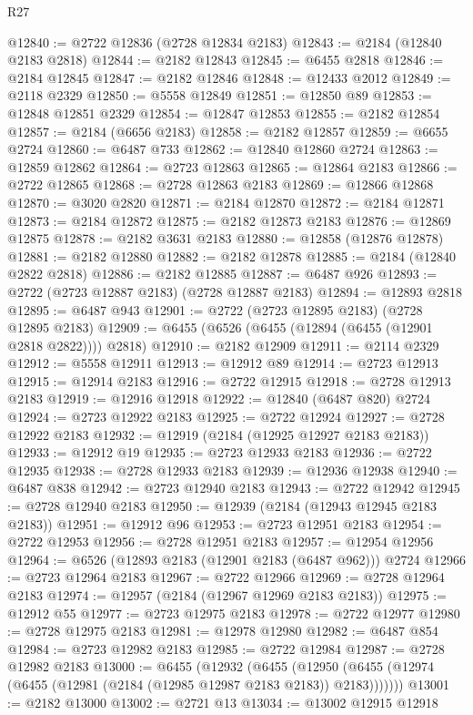 \begin{lexlean}{R27}
\begin{coremodule}
@12840 := @2722 @12836 (@2728 @12834 @2183)
@12843 := @2184 (@12840 @2183 @2818)
@12844 := @2182 @12843
@12845 := @6455 @2818
@12846 := @2184 @12845
@12847 := @2182 @12846
@12848 := @12433 @2012
@12849 := @2118 @2329
@12850 := @5558 @12849
@12851 := @12850 @89
@12853 := @12848 @12851 @2329
@12854 := @12847 @12853
@12855 := @2182 @12854
@12857 := @2184 (@6656 @2183)
@12858 := @2182 @12857
@12859 := @6655 @2724
@12860 := @6487 @733
@12862 := @12840 @12860 @2724
@12863 := @12859 @12862
@12864 := @2723 @12863
@12865 := @12864 @2183
@12866 := @2722 @12865
@12868 := @2728 @12863 @2183
@12869 := @12866 @12868
@12870 := @3020 @2820
@12871 := @2184 @12870
@12872 := @2184 @12871
@12873 := @2184 @12872
@12875 := @2182 @12873 @2183
@12876 := @12869 @12875
@12878 := @2182 @3631 @2183
@12880 := @12858 (@12876 @12878)
@12881 := @2182 @12880
@12882 := @2182 @12878
@12885 := @2184 (@12840 @2822 @2818)
@12886 := @2182 @12885
@12887 := @6487 @926
@12893 := @2722 (@2723 @12887 @2183) (@2728 @12887 @2183)
@12894 := @12893 @2818
@12895 := @6487 @943
@12901 := @2722 (@2723 @12895 @2183) (@2728 @12895 @2183)
@12909 := @6455 (@6526 (@6455 (@12894 (@6455 (@12901 @2818 @2822)))) @2818)
@12910 := @2182 @12909
@12911 := @2114 @2329
@12912 := @5558 @12911
@12913 := @12912 @89
@12914 := @2723 @12913
@12915 := @12914 @2183
@12916 := @2722 @12915
@12918 := @2728 @12913 @2183
@12919 := @12916 @12918
@12922 := @12840 (@6487 @820) @2724
@12924 := @2723 @12922 @2183
@12925 := @2722 @12924
@12927 := @2728 @12922 @2183
@12932 := @12919 (@2184 (@12925 @12927 @2183 @2183))
@12933 := @12912 @19
@12935 := @2723 @12933 @2183
@12936 := @2722 @12935
@12938 := @2728 @12933 @2183
@12939 := @12936 @12938
@12940 := @6487 @838
@12942 := @2723 @12940 @2183
@12943 := @2722 @12942
@12945 := @2728 @12940 @2183
@12950 := @12939 (@2184 (@12943 @12945 @2183 @2183))
@12951 := @12912 @96
@12953 := @2723 @12951 @2183
@12954 := @2722 @12953
@12956 := @2728 @12951 @2183
@12957 := @12954 @12956
@12964 := @6526 (@12893 @2183 (@12901 @2183 (@6487 @962))) @2724
@12966 := @2723 @12964 @2183
@12967 := @2722 @12966
@12969 := @2728 @12964 @2183
@12974 := @12957 (@2184 (@12967 @12969 @2183 @2183))
@12975 := @12912 @55
@12977 := @2723 @12975 @2183
@12978 := @2722 @12977
@12980 := @2728 @12975 @2183
@12981 := @12978 @12980
@12982 := @6487 @854
@12984 := @2723 @12982 @2183
@12985 := @2722 @12984
@12987 := @2728 @12982 @2183
@13000 := @6455
    (@12932
      (@6455 (@12950 (@6455 (@12974 (@6455 (@12981 (@2184 (@12985 @12987 @2183 @2183)) @2183)))))))
@13001 := @2182 @13000
@13002 := @2721 @13
@13034 := @13002
    @12915
    @12918

\end{coremodule}
\end{lexlean}

